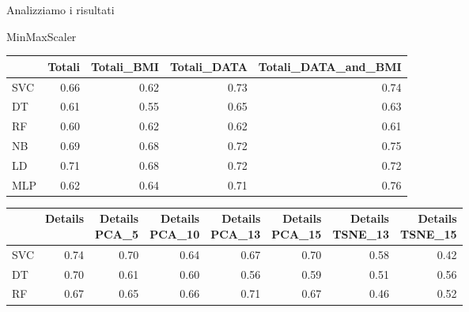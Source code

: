 \documentclass{beamer}
\begin{document}
\begin{frame}{Analizziamo i risultati}
	\begin{block}{MinMaxScaler}
		\begin{center}
			\begin{adjustbox}{max width=\textwidth}
				\begin{tabular}{lrrrr}
					\toprule
					{} &    Totali &  Totali\_BMI &  Totali\_DATA &  Totali\_DATA\_and\_BMI \\
					\midrule
					SVC &  0.66 &         0.62 &          0.73 &                  0.74 \\
					DT  &  0.61 &         0.55 &          0.65 &                  0.63 \\
					RF  &  0.60 &         0.62 &          0.62 &                  0.61 \\
					NB  &  0.69 &         0.68 &          0.72 &                  0.75 \\
					LD  &  0.71 &         0.68 &          0.72 &                  0.72 \\
					MLP &  0.62 &         0.64 &          0.71 &                  0.76 \\
					\bottomrule
				\end{tabular}
			\end{adjustbox}
		\end{center}
		\begin{center}
			\begin{adjustbox}{max width=\textwidth}
				\begin{tabular}{lrrrrrrr}
					\toprule
					{} &   Details &  \thead{Details\\PCA\_5} &  \thead{Details\\PCA\_10} &  \thead{Details\\PCA\_13} &  \thead{Details\\PCA\_15} &  \thead{Details\\TSNE\_13} &  \thead{Details\\TSNE\_15} \\
					\midrule
					SVC &  0.74 &                  0.70 &                   0.64 &                   0.67 &                   0.70 &                    0.58 &                    0.42 \\
					DT  &  0.70 &                  0.61 &                   0.60 &                   0.56 &                   0.59 &                    0.51 &                    0.56 \\
					RF  &  0.67 &                  0.65 &                   0.66 &                   0.71 &                   0.67 &                    0.46 &                    0.52 \\

\end{tabular}
\end{adjustbox}
\end{center}
\end{block}
\end{frame}
\end{document}
